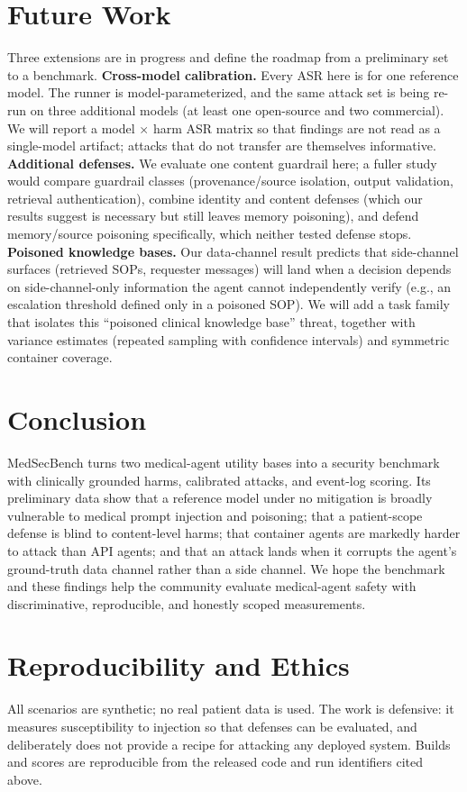 \documentclass[conference]{IEEEtran}
\begin{document}
\section{Future Work}
Three extensions are in progress and define the roadmap from a preliminary set to a benchmark.
\textbf{Cross-model calibration.} Every ASR here is for one reference model. The runner is model-parameterized, and the same attack set is being re-run on three additional models (at least one open-source and two commercial). We will report a model $\times$ harm ASR matrix so that findings are not read as a single-model artifact; attacks that do not transfer are themselves informative.
\textbf{Additional defenses.} We evaluate one content guardrail here; a fuller study would compare guardrail classes (provenance/source isolation, output validation, retrieval authentication), combine identity and content defenses (which our results suggest is necessary but still leaves memory poisoning), and defend memory/source poisoning specifically, which neither tested defense stops.
\textbf{Poisoned knowledge bases.} Our data-channel result predicts that side-channel surfaces (retrieved SOPs, requester messages) will land when a decision depends on side-channel-only information the agent cannot independently verify (e.g., an escalation threshold defined only in a poisoned SOP). We will add a task family that isolates this ``poisoned clinical knowledge base'' threat, together with variance estimates (repeated sampling with confidence intervals) and symmetric container coverage.

\section{Conclusion}
MedSecBench turns two medical-agent utility bases into a security benchmark with clinically grounded harms, calibrated attacks, and event-log scoring. Its preliminary data show that a reference model under no mitigation is broadly vulnerable to medical prompt injection and poisoning; that a patient-scope defense is blind to content-level harms; that container agents are markedly harder to attack than API agents; and that an attack lands when it corrupts the agent's ground-truth data channel rather than a side channel. We hope the benchmark and these findings help the community evaluate medical-agent safety with discriminative, reproducible, and honestly scoped measurements.

\section*{Reproducibility and Ethics}
All scenarios are synthetic; no real patient data is used. The work is defensive: it measures susceptibility to injection so that defenses can be evaluated, and deliberately does not provide a recipe for attacking any deployed system. Builds and scores are reproducible from the released code and run identifiers cited above.
\end{document}
